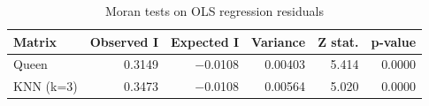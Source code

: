 \begin{table}[ht]
\centering
\caption{Moran tests on OLS regression residuals} 
\label{tab:moran_resid}
\begin{tabular}{lrrrrr}
  \toprule
Matrix & Observed I & Expected I & Variance & Z stat. & p-value \\ 
  \midrule
Queen & 0.3149 & $-$0.0108 & 0.00403 & 5.414 & 0.0000 \\
  KNN (k=3) & 0.3473 & $-$0.0108 & 0.00564 & 5.020 & 0.0000 \\
   \bottomrule
\end{tabular}
\end{table}
